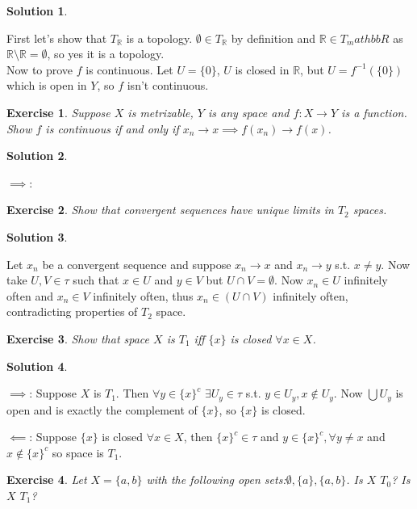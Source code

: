 \documentclass[11pt,a4paper]{article}
\newtheorem{Ex}{Exercise}
\newtheorem{Sol}{Solution}
\begin{document}
\begin{Sol} \end{Sol}
\noindent First let's show that $T_\mathbb{R}$ is a topology. $\emptyset \in T_\mathbb{R}$ by definition and $\mathbb{R} \in T_mathbb{R}$ as $\mathbb{R} \setminus \mathbb{R} = \emptyset$, so yes it is a topology.\\ 
Now to prove $f$ is continuous. Let $U = \{0\}$, $U$ is closed in $\mathbb{R}$, but $U = f^{-1}(\{0\})$ which is open in $Y$, so $f$ isn't continuous. \\

\begin{Ex}
	Suppose $X$ is metrizable, $Y$ is any space and $f: X \rightarrow Y$ is a function. Show $f$ is continuous if and only if $x_n \rightarrow x \implies f(x_n) \rightarrow f(x)$.
\end{Ex}

\begin{Sol} \end{Sol}
\noindent $\implies$: 

\begin{Ex}
	Show that convergent sequences have unique limits in $T_2$ spaces.
\end{Ex}
\begin{Sol} \end{Sol}
\noindent Let $x_n$ be a convergent sequence and suppose $x_n \rightarrow x$ and $x_n \rightarrow y$ s.t. $x \neq y$. Now take $U,V \in \tau $ such that $x \in U$ and $y \in V$ but $U \cap V = \emptyset$. Now $x_n \in U$ infinitely often and $x_n \in V$ infinitely often, thus $x_n \in (U \cap V)$ infinitely often, contradicting properties of $T_2$ space.

\begin{Ex}
	Show that space $X$ is $T_1$ iff $\{x\}$ is closed $\forall x \in X$.
\end{Ex}

\begin{Sol} \end{Sol}
\noindent $\implies$: Suppose $X$ is $T_1$. Then $\forall y \in \{x\}^c$  $\exists U_y \in \tau$ s.t. $y \in U_y, x\not\in U_y$. Now $\bigcup U_y$ is open and is exactly the complement of $\{x\}$, so $\{x\}$ is closed.  

\noindent$\impliedby$: Suppose $\{x\}$ is closed $\forall x \in X$, then $\{x\}^c \in \tau$ and $y \in \{x\}^c, \forall y\neq x$ and $x \not\in \{x\}^c$ so space is $T_1$.

\begin{Ex}
Let $X=\{a,b\}$ with the following open sets:$\emptyset, \{a\}, \{a,b\}$. Is $X$ $T_0$? Is $X$ $T_1$? 
\end{Ex}
\end{document}
